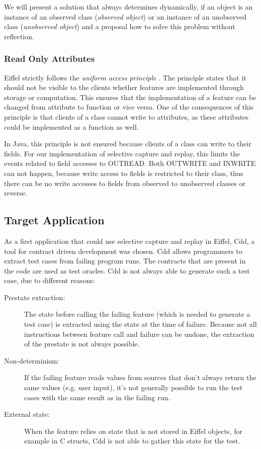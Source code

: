 We will present a solution that always determines dynamically, if an object is an instance of an observed class (\emph{observed object}) or an instance of an unobserved class (\emph{unobserved object}) and a proposal how to solve this problem without reflection.

\subsubsection{Read Only Attributes}
Eiffel strictly follows the \emph{uniform access principle} \cite{oosc2}. The principle states that it should not be visible to the clients whether features are implemented through storage or computation. This ensures that the implementation of a feature can be changed from attribute to function or vice versa. One of the consequences of this principle is that clients of a class cannot write to attributes, as these attributes could be implemented as a function as well.

In Java, this principle is not ensured because clients of a class can write to their fields. For our implementation of selective capture and replay, this limits the events related to field accesses to OUTREAD. Both OUTWRITE and INWRITE can not happen, because write access to fields is restricted to their class, thus there can be no write accesses to fields from observed to unobserved classes or reverse.

\subsection{Target Application}
As a first application that could use selective capture and replay in Eiffel, Cdd, a tool for contract driven development \cite{cdd07} was chosen. Cdd allows programmers to extract test cases from failing program runs. The contracts that are present in the code are used as test oracles. Cdd is not always able to generate such a test case, due to different reasons:

\begin{description}
\item [Prestate extraction:] The state before calling the failing feature (which is needed to generate a test case) is extracted using the state at the time of failure. Because not all instructions between feature call and failure can be undone, the extraction of the prestate is not always possible.
\item [Non-determinism:] If the failing feature reads values from sources that don't always return the same values (e.g. user input), it's not generally possible to run the test cases with the same result as in the failing run.
\item [External state:] When the feature relies on state that is not stored in Eiffel objects, for example in C structs, Cdd is not able to gather this state for the test.
\end{description}

